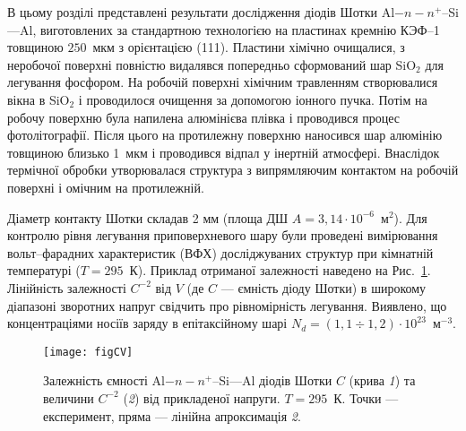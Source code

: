 

В цьому розділі представлені результати дослідження діодів Шотки Al$-n-n^+$--Si---Al,
виготовлених за стандартною технологією \cite{Vorobets:FM2003,StrihaBook1987} на пластинах кремнію КЭФ--1 товщиною $250$~мкм
з орієнтацією (111).
Пластини хімічно очищалися, з неробочої поверхні
повністю видалявся попередньо сформований шар SiO$_2$ для легування фосфором.
На робочій поверхні хімічним травленням створювалися вікна в SiO$_2$ і проводилося очищення
за допомогою іонного пучка.
Потім на робочу поверхню була напилена алюмінієва плівка і проводився процес фотолітографії.
Після цього на протилежну поверхню наносився шар алюмінію товщиною близько 1~мкм і проводився відпал
у інертній атмосфері.
Внаслідок термічної обробки утворювалася структура з випрямляючим контактом на робочій поверхні і омічним на протилежній.

Діаметр контакту Шотки складав 2 мм (площа ДШ $A=3,14\cdot10^{-6}$~м$^2$).
Для контролю рівня легування приповерхневого шару були проведені
вимірювання вольт--фарадних характеристик (ВФХ) досліджуваних структур при кімнатній температурі ($T = 295$~К).
Приклад отриманої залежності наведено на Рис.~\ref{figCV}.
Лінійність залежності $C^{-2}$ від $V$
(де $C$ --- ємність діоду Шотки)
в широкому діапазоні зворотних напруг свідчить про рівномірність легування.
Виявлено, що концентраціями носіїв заряду в епітаксійному шарі $N_d=(1,1\div1,2)\cdot10^{23}$~м$^{-3}$.


\begin{figure}
\center
\texttt{[image: figCV]}
\caption{\label{figCV}
Залежність ємності Al$-n-n^+$--Si---Al діодів Шотки $C$ (крива \emph{1}) та величини $C^{-2}$ (\emph{2}) від прикладеної напруги.
$T=295$~К.
Точки --- експеримент, пряма --- лінійна апроксимація  \emph{2}.
}%
\end{figure}











